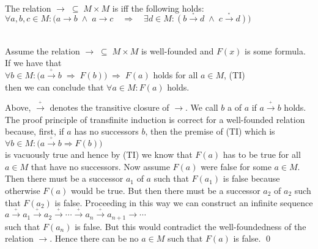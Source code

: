 \begin{Definition} \hspace*{\fill} \\
  The relation $\rightarrow \;\subseteq\; M \times M$ is  iff the following holds:
  \\[0.2cm]
  \hspace*{1.3cm}
  $\forall a, b, c \in M: \bigl(a \rightarrow b \;\wedge\; a \rightarrow c \quad\Rightarrow\quad
   \exists d \in M: (b \stackrel{_*}{\rightarrow} d \;\wedge\; c \stackrel{_*}{\rightarrow} d)\bigr)
  $  \eox
\end{Definition}

\begin{Theorem} \hspace*{\fill} \\
  Assume the relation $\rightarrow \;\subseteq\; M \times M$ is well-founded and $F(x)$ is some formula.
  If we have that
  \\[0.2cm]
  \hspace*{1.3cm}
  $\forall b \in M: \bigl( a \stackrel{_+}{\rightarrow} b \;\Rightarrow\; F(b)\bigr) \;\Rightarrow\; F(a)$ holds for all $a \in M$, \hspace*{\fill} (TI)
  \\[0.2cm]
  then we can conclude that $\forall a \in M: F(a)$ holds.
\end{Theorem}

\proof
Above, $\stackrel{_+}{\rightarrow}$ denotes the transitive closure of $\rightarrow$.  We call $b$ a  of $a$
if $a \stackrel{_+}{\rightarrow} b$ holds.  The proof principle of transfinite induction is correct for a well-founded
relation because, first, if $a$ has no successors $b$, then the premise of (TI) which is
\\[0.2cm]
\hspace*{1.3cm}
$\forall b \in M: \bigl( a \stackrel{_+}{\rightarrow} b \Rightarrow F(b)\bigr)$
\\[0.2cm]
is vacuously true and hence by (TI) we know that $F(a)$ has to be true for all $a \in M$ that have no
successors.  Now assume $F(a)$ were false for some $a \in M$.  Then there must be a successor $a_1$ of $a$ such
that $F(a_1)$ is false because otherwise $F(a)$ would be true.  But then there must be a successor $a_2$ of
$a_2$ such that $F(a_2)$ is false.  Proceeding in this way we can construct an infinite sequence
\\[0.2cm]
\hspace*{1.3cm}
$a \stackrel{_+}{\rightarrow} a_1 \stackrel{_+}{\rightarrow} a_2 \stackrel{_+}{\rightarrow} \cdots \stackrel{_+}{\rightarrow} a_n \stackrel{_+}{\rightarrow} a_{n+1} \rightarrow
\cdots
$
\\[0.2cm]
such that $F(a_n)$ is false.  But this would contradict the well-foundedness of the relation $\rightarrow$.  Hence there can be no $a \in M$
such that $F(a)$ is false. \qed

